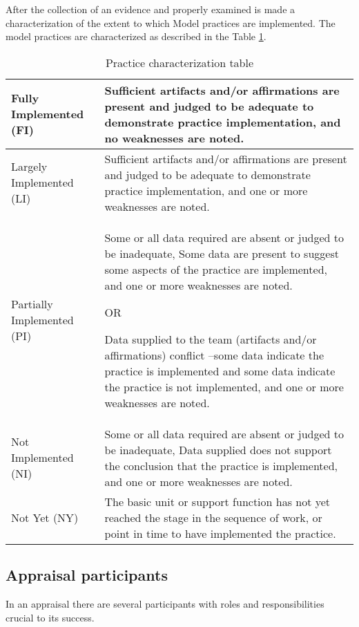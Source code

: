 \newpage
After the collection of an evidence and properly examined is made a characterization of the extent to which Model practices are implemented. The model practices are characterized as described in the Table \ref{tab:characterizations}.
\newline

\begin{table}[h]
	\centering
	\caption{Practice characterization table}
	\begin{tabular}{|p{4cm}|p{9cm}|}
		\hline
		Fully Implemented (FI)   & Sufficient artifacts and/or affirmations are present and
		judged to be adequate to demonstrate practice implementation, and
		no weaknesses are noted.    \\
		\hline
		Largely Implemented (LI) & Sufficient artifacts and/or affirmations are present and
		judged to be adequate to demonstrate practice implementation, and
		one or more weaknesses are noted.  \\ 
		\hline
		Partially Implemented (PI) & Some or all data required are absent or judged to be
		inadequate,
		Some data are present to suggest some aspects of the practice are
		implemented, and
		one or more weaknesses are noted.
		
		
		OR
		
		
		Data supplied to the team (artifacts and/or affirmations) conflict –some data
		indicate the practice is implemented and some data indicate the practice is
		not implemented, and
		one or more weaknesses are noted.\\
		\hline
		Not Implemented (NI) & Some or all data required are absent or judged to be
		inadequate,
		Data supplied does not support the conclusion that the practice is
		implemented, and
		one or more weaknesses are noted. \\
		\hline
		Not Yet (NY) & The basic unit or support function has not yet reached the stage in the
		sequence of work, or point in time to have implemented the practice. \\
		\hline
	\end{tabular}
	\label{tab:characterizations}
\end{table}





\subsection{Appraisal participants}
In an appraisal there are several participants with roles and responsibilities crucial to its success.

